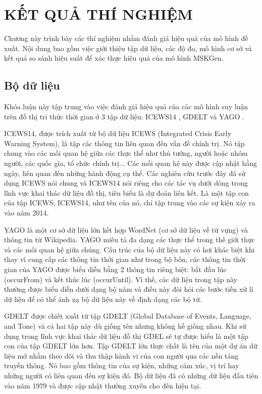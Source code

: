 \chapter{KẾT QUẢ THÍ NGHIỆM}
\label{Chapter5}
Chương này trình bày các thí nghiệm nhằm đánh giá hiệu quả của mô hình đề xuất. Nội dung bao gồm việc giới thiệu tập dữ liệu, các độ đo, mô hình cơ sở và kết quả so sánh hiệu suất để xác thực hiệu quả của mô hình MSKGen.

\section{Bộ dữ liệu}
Khóa luận này tập trung vào việc đánh giá hiệu quả của các mô hình suy luận trên đồ thị tri thức thời gian ở 3 tập dữ liệu: ICEWS14 \cite{ref_article19}, GDELT \cite{ref_article20} và YAGO \cite{ref_article21}. 

ICEWS14, được trích xuất từ bộ dữ liệu ICEWS (Integrated Crisis Early Warning System), là tập các thông tin liên quan đến vấn đề chính trị. Nó tập chung vào các mối quan hệ giữa các thực thể như thủ tướng, người hoặc nhóm người, các quốc gia, tổ chức chính trị... Các mối quan hệ này được cập nhật hằng ngày, liên quan đến những hành động cụ thể. Các nghiên cứu trước đây đã sử dụng ICEWS nói chung và ICEWS14 nói riêng cho các tác vụ dưới dòng trong lĩnh vực khai thác dữ liệu đồ thị, tiêu biểu là dự đoán liên kết. Là một tập con của tập ICEWS, ICEWS14, như tên của nó, chỉ tập trung vào các sự kiện xảy ra vào năm 2014.

YAGO là một cơ sở dữ liệu lớn kết hợp WordNet (cơ sở dữ liệu về từ vựng) và thông tin từ Wikipedia. YAGO miêu tả đa dạng các thực thể
trong thế giới thực và các mối quan hệ giữa chúng. Cấu trúc của bộ dữ liệu này có hơi khác biệt khi thay vì cung cấp các thông tin thời gian như trong bộ bốn, các thông tin thời gian của YAGO được biểu diễn bằng 2 thông tin riêng biệt: bắt đầu lúc (occurFrom) và kết thúc lúc (occurUntil). Vì thế, các dữ liệu trong tập này thường được biểu diễn dưới dạng bộ năm và điều này đòi hỏi các bước tiền xử lí dữ liệu để có thể ánh xạ bộ dữ liệu này về định dạng các bộ tứ.

GDELT được chiết xuất từ tập GDELT (Global Database of Events, Language, and Tone) và cả hai tập này dù giống tên nhưng không hề giống nhau. Khi sử dụng trong lĩnh vực khai thác dữ liệu đồ thị GDEL sẽ tự được hiểu là một tập con của tập GDELT lớn hơn. Tập GDELT lớn thực chất là tên của một dự án dữ liệu mở nhằm theo dõi và thu thập hành vi của con người qua các nền tảng truyền thông. Nó bao gồm thông tin của sự kiện, những cảm xúc, vị trí hay những người có liên quan đến sự kiện đó. Bộ dữ liệu đã có những dữ liệu đầu tiên vào năm 1979 và được cập nhật thường xuyên cho đến hiện tại.

